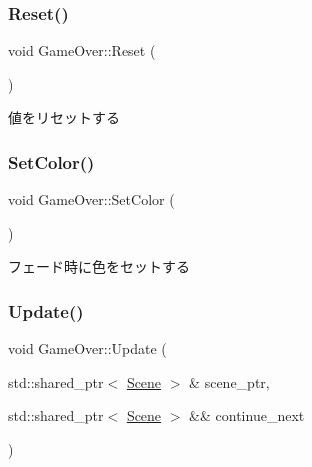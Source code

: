 \mbox{\label{class_game_over_afed8423e1fc3b76ba826b9c376913df9}} 
\subsubsection{\texorpdfstring{Reset()}{Reset()}}
{\footnotesize\ttfamily void Game\+Over\+::\+Reset (\begin{DoxyParamCaption}{ }\end{DoxyParamCaption})\hspace{0.3cm}{\ttfamily [inline]}}



値をリセットする 

\mbox{\label{class_game_over_ab5d86cf67969620b78fb6f978802daca}} 
\subsubsection{\texorpdfstring{Set\+Color()}{SetColor()}}
{\footnotesize\ttfamily void Game\+Over\+::\+Set\+Color (\begin{DoxyParamCaption}{ }\end{DoxyParamCaption})\hspace{0.3cm}{\ttfamily [inline]}}



フェード時に色をセットする 

\mbox{\label{class_game_over_a13dd856f7d38020ad388cacda5fef575}} 
\subsubsection{\texorpdfstring{Update()}{Update()}}
{\footnotesize\ttfamily void Game\+Over\+::\+Update (\begin{DoxyParamCaption}\item[{std\+::shared\+\_\+ptr$<$ \mbox{\hyperlink{class_scene}{Scene}} $>$ \&}]{scene\+\_\+ptr,  }\item[{std\+::shared\+\_\+ptr$<$ \mbox{\hyperlink{class_scene}{Scene}} $>$ \&\&}]{continue\+\_\+next }\end{DoxyParamCaption})}



